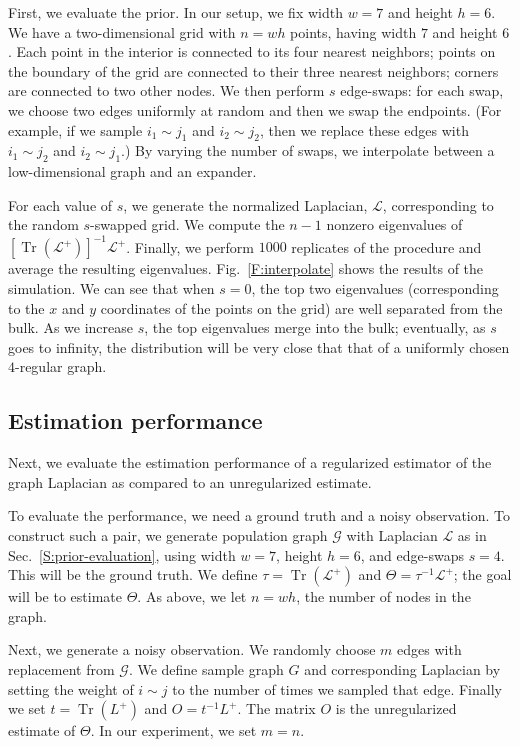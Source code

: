 \documentclass[12pt]{article}
\DeclareMathOperator*{\Tr}{Tr}
\theoremstyle{plain}
\begin{document}
First, we evaluate the prior.  In our setup, we fix width $w = 7$ and
height $h = 6$.  We have a two-dimensional grid with $n = w h$ points,
having width $7$ and height $6$.  Each point in the
interior is connected to its four nearest neighbors; points on the
boundary of the grid are connected to their three nearest neighbors;
corners are connected to two other nodes.  We then perform
$s$ edge-swaps: for each swap, we choose two edges
uniformly at random and then we swap the endpoints.  (For example, if
we sample $i_1 \sim j_1$ and $i_2 \sim j_2$, then we replace these
edges with $i_1 \sim j_2$ and $i_2 \sim j_1$.)  By varying the number
of swaps, we interpolate between a low-dimensional graph and an expander.

For each value of $s$, we generate the normalized Laplacian, $\mathcal{L}$,
corresponding to the random $s$-swapped grid.  We compute the $n-1$ nonzero
eigenvalues of $[\Tr(\mathcal{L}^{+})]^{-1} \mathcal{L}^{+}$.
Finally, we perform $1000$ replicates of the procedure and average the
resulting eigenvalues.  Fig.~\ref{F:interpolate} shows the results of
the simulation.  We can see that when $s = 0$, the top two eigenvalues
(corresponding to the $x$ and $y$ coordinates of the points on the grid)
are well separated from the bulk.  As we increase $s$, the top eigenvalues
merge into the bulk; eventually, as $s$ goes to infinity, the
distribution will be very close that that of a uniformly chosen
$4$-regular graph.


\subsection{Estimation performance}\label{S:estimation}

Next, we evaluate the estimation performance of a regularized
estimator of the graph Laplacian as compared to an unregularized
estimate.

To evaluate the performance, we need a ground truth and a noisy
observation.  To construct such a pair, we generate population graph
$\mathcal{G}$ with Laplacian $\mathcal{L}$ as in
Sec.~\ref{S:prior-evaluation}, using width $w = 7$, height $h = 6$,
and edge-swaps $s = 4$.  This will be the ground truth.  We define
$\tau = \Tr(\mathcal{L}^+)$ and $\Theta = \tau^{-1} \mathcal{L}^+$;
the goal will be to estimate $\Theta$.  As above, we let $n = w h$,
the number of nodes in the graph.

Next, we generate a noisy observation.  We randomly choose $m$ edges
with replacement from $\mathcal{G}$.  We define sample graph $G$
and corresponding Laplacian by setting the weight of $i \sim j$
to the number of times we sampled that edge.  Finally we set
$t = \Tr(L^+)$ and $O = t^{-1} L^+$.  The matrix $O$ is the
unregularized estimate of $\Theta$.  In our experiment, we set $m = n$.
\end{document}
